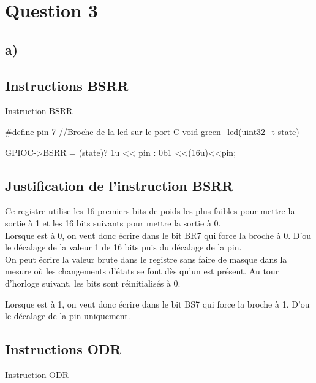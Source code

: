 {\section{Question 3}

\subsection{a)}

\subsection{Instructions BSRR}

\begin{Cpp}{Instruction BSRR}
  
  #define pin 7 //Broche de la led sur le port C
  void green_led(uint32_t state) {

    GPIOC->BSRR = (state)?  1u << pin  :  0b1 <<(16u)<<pin;
    
  }
  

\end{Cpp}

\subsection{Justification de l'instruction BSRR}

Ce registre utilise les 16 premiers bits de poids les plus faibles pour mettre la sortie à 1 et 
les 16 bits suivants pour mettre la sortie à 0. \\

Lorsque  est à 0, on veut donc écrire dans le bit BR7 qui force la broche à 0. 
D'ou le décalage de la valeur 1 de 16 bits puis du décalage de la pin. \\
On peut écrire la valeur brute dans le registre sans faire de masque dans la mesure où 
les changements d'états se font dès qu'un  est présent. Au tour d'horloge suivant, les bits sont réinitialisés à 0.

Lorsque  est à 1, on veut donc écrire dans le bit BS7 qui force la broche à 1. 
D'ou le décalage de la pin uniquement. \\



\subsection{Instructions ODR}

\begin{Cpp}{Instruction ODR}
  

\end{Cpp}}
